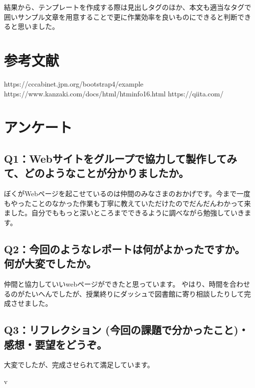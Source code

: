 結果から、テンプレートを作成する際は見出しタグのほか、本文も適当なタグで囲いサンプル文章を用意することで更に作業効率を良いものにできると判断できると思いました。

\section{参考文献}
https://cccabinet.jpn.org/bootstrap4/example\newline
https://www.kanzaki.com/docs/html/htminfo16.html\newline
https://qiita.com/

\section{アンケート}

\subsection{Q1：Webサイトをグループで協力して製作してみて、どのようなことが分かりましたか。}
ぼくがWebページを起こせているのは仲間のみなさまのおかげです。今まで一度もやったことのなかった作業も丁寧に教えていただけたのでだんだんわかって来ました。自分でももっと深いところまでできるように調べながら勉強していきます。

\subsection{Q2：今回のようなレポートは何がよかったですか。何が大変でしたか。}
仲間と協力していいwebページができたと思っています。\newline
やはり、時間を合わせるのがたいへんでしたが、授業終りにダッシュで図書館に寄り相談したりして完成させました。

\subsection{Q3：リフレクション (今回の課題で分かったこと)・感想・要望をどうぞ。}
大変でしたが、完成させられて満足しています。



v